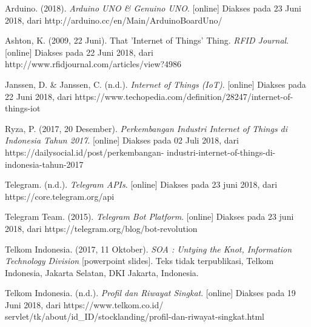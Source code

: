 \begin{thebibliography}{9}
	
	Arduino. (2018). \textit{Arduino UNO \& Genuino UNO}. [online] Diakses pada 23 Juni 2018, dari http://arduino.cc/en/Main/ArduinoBoardUno/
		
	Ashton, K. (2009, 22 Juni). That 'Internet of Things' Thing. \textit{RFID Journal}. [online] Diakses pada 22 Juni 2018, dari http://www.rfidjournal.com/articles/view?4986
	
	Janssen, D. \& Janssen, C. (n.d.). \textit{Internet of Things (IoT)}. [online] Diakses pada 22 Juni 2018, dari https://www.techopedia.com/definition/28247/internet-of-things-iot
	
	Ryza, P. (2017, 20 Desember). 
	\textit{Perkembangan Industri Internet of Things di Indonesia Tahun 2017}. [online] Diakses pada 02 Juli 2018, dari https://dailysocial.id/post/perkembangan- industri-internet-of-things-di-indonesia-tahun-2017
	
	Telegram. (n.d.). \textit{Telegram APIs}. [online] Diakses pada 23 juni 2018, dari https://core.telegram.org/api
	
	Telegram Team. (2015). \textit{Telegram Bot Platform}. [online] Diakses pada 23 juni 2018, dari https://telegram.org/blog/bot-revolution
	
	Telkom Indonesia. (2017, 11 Oktober). \textit{SOA : Untying the Knot, Information Technology Division} [powerpoint slides]. Teks tidak terpublikasi, Telkom Indonesia, Jakarta Selatan, DKI Jakarta, Indonesia. 
	
	Telkom Indonesia. (n.d.). \textit{Profil dan Riwayat Singkat}. [online] Diakses pada 19 Juni 2018, dari  https://www.telkom.co.id/ servlet/tk/about/id\_ID/stocklanding/profil-dan-riwayat-singkat.html
	

	


	
	


	
\end{thebibliography}

